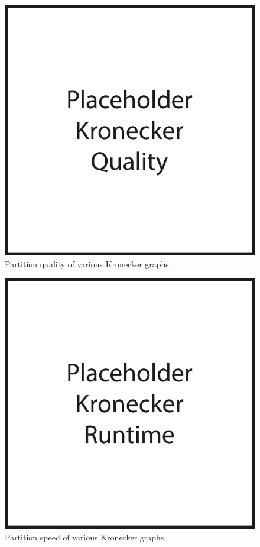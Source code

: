 \begin{figure}[h!]
\centering
  \includegraphics[width=0.8\columnwidth]{figures/kronecker_quality_tests.pdf}
  \caption{Partition quality of various Kronecker graphs.}
  \label{fig:kronqual}
\end{figure}

\begin{figure}[h!]
\centering
  \includegraphics[width=0.8\columnwidth]{figures/kronecker_speed_tests.pdf}
  \caption{Partition speed of various Kronecker graphs.}
  \label{fig:kronspeed}
\end{figure}


